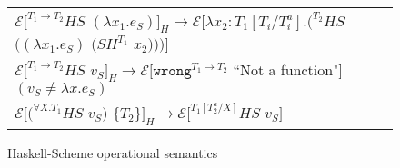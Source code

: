 \begin{figure}[p]
\begin{tabular}{l}
$\mathscr{E}[^{T_{1}\rightarrow T_{2}}HS$ $(\lambda x_{1}.e_{S})]_{H}\rightarrow\mathscr{E}[\lambda x_{2}:T_{1}[T_{i}/T^{a}_{i}].(^{T_{2}}HS$ $((\lambda x_{1}.e_{S})$ $(SH^{T_{1}}$ $x_{2})))]$ \\

\vspace{5pt}

$\mathscr{E}[^{T_{1}\rightarrow T_{2}}HS$ $v_{S}]_{H}\rightarrow\mathscr{E}[\mathtt{wrong}^{T_{1}\rightarrow T_{2}}$ ``Not a function"$]$ $(v_{S}\neq\lambda x.e_{S})$ \\

\vspace{5pt}

$\mathscr{E}[(^{\forall X.T_{1}}HS$ $v_{S})$ $\lbrace T_{2}\rbrace]_{H}\rightarrow\mathscr{E}[^{T_{1}[T^{a}_{2}/X]}HS$ $v_{S}]$
\end{tabular}
\caption{Haskell-Scheme operational semantics}
\label{hsos}
\end{figure}